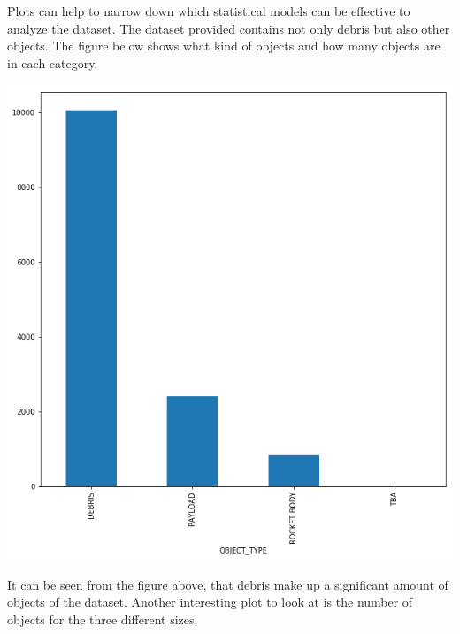 \documentclass[12pt,a4paper]{article}
\begin{document}
Plots can help to narrow down which statistical models can be effective to analyze the dataset. The dataset provided contains not only debris but also other objects. The figure below shows what kind of objects and how many objects are in each category.
\begin{center}
	\includegraphics[scale=0.2]{figures/object_types.png}
	\label{fig:object_types}
\end{center}
It can be seen from the figure above, that debris make up a significant amount of objects of the dataset. Another interesting plot to look at is the number of objects for the three different sizes.
\end{document}
